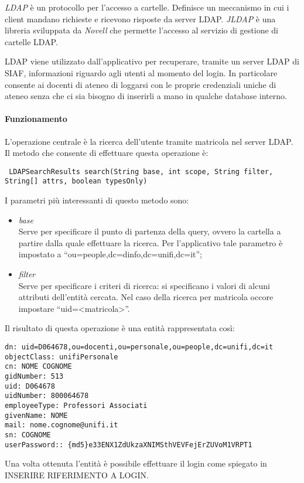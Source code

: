 \textsl{LDAP} è un protocollo per l'accesso a cartelle. Definisce un meccanismo in cui i client mandano richieste e ricevono risposte da server LDAP.
\textsl{JLDAP} è una libreria sviluppata da \textsl{Novell} che permette l'accesso al servizio di gestione di cartelle LDAP.

LDAP viene utilizzato dall'applicativo per recuperare, tramite un server LDAP di SIAF, informazioni riguardo agli utenti al momento del login. In particolare consente ai docenti di ateneo di loggarsi con le proprie credenziali uniche di ateneo 
senza che ci sia bisogno di inserirli a mano in qualche database interno.

\paragraph{Funzionamento}
L'operazione centrale è la ricerca dell'utente tramite matricola nel server LDAP. Il metodo che consente di effettuare questa operazione è:

\begin{lstlisting}
 LDAPSearchResults search(String base, int scope, String filter, String[] attrs, boolean typesOnly) 
\end{lstlisting}

I parametri più interessanti di questo metodo sono:
\begin{itemize}
 \item \textsl{base}\\
  Serve per specificare il punto di partenza della query, ovvero la cartella a partire dalla quale effettuare la ricerca. Per l'applicativo tale parametro è impostato a ``ou=people,dc=dinfo,dc=unifi,dc=it'';
  \item \textsl{filter}\\
  Serve per specificare i criteri di ricerca: si specificano i valori di alcuni attributi dell'entità cercata. Nel caso della ricerca per matricola occore impostare ``uid=<matricola>''.
\end{itemize}

Il risultato di questa operazione è una entità rappresentata così:

\begin{lstlisting}
dn: uid=D064678,ou=docenti,ou=personale,ou=people,dc=unifi,dc=it
objectClass: unifiPersonale
cn: NOME COGNOME
gidNumber: 513
uid: D064678
uidNumber: 800064678
employeeType: Professori Associati
givenName: NOME
mail: nome.cognome@unifi.it
sn: COGNOME
userPassword:: {md5}e33ENX1ZdUkzaXNIMSthVEVFejErZUVoM1VRPT1
\end{lstlisting}

Una volta ottenuta l'entità è possibile effettuare il login come spiegato in INSERIRE RIFERIMENTO A LOGIN.
